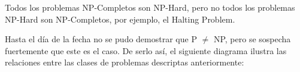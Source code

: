 Todos los problemas NP-Completos son NP-Hard, pero no todos los problemas NP-Hard son NP-Completos, por ejemplo, el Halting Problem.

Hasta el d\'ia de la fecha no se pudo demostrar que P $\neq$ NP, pero se sospecha fuertemente que este es el caso. De serlo as\'i, el siguiente diagrama ilustra las relaciones entre las clases de problemas descriptas anteriormente:

\begin{figure}[htb]
    \centering
    
\end{figure}


